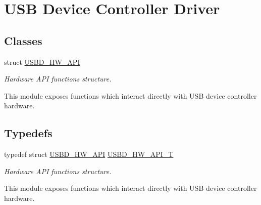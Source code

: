 \hypertarget{group__USBD__HW}{}\section{U\+SB Device Controller Driver}
\label{group__USBD__HW}
\subsection*{Classes}
\begin{DoxyCompactItemize}
\item 
struct \hyperlink{structUSBD__HW__API}{U\+S\+B\+D\+\_\+\+H\+W\+\_\+\+A\+PI}
\begin{DoxyCompactList}\small\item\em Hardware A\+PI functions structure.

This module exposes functions which interact directly with U\+SB device controller hardware. \end{DoxyCompactList}\end{DoxyCompactItemize}
\subsection*{Typedefs}
\begin{DoxyCompactItemize}
\item 
typedef struct \hyperlink{structUSBD__HW__API}{U\+S\+B\+D\+\_\+\+H\+W\+\_\+\+A\+PI} \hyperlink{group__USBD__HW_ga4df5b7beaddc4e9267c320d92b4434fc}{U\+S\+B\+D\+\_\+\+H\+W\+\_\+\+A\+P\+I\+\_\+T}
\begin{DoxyCompactList}\small\item\em Hardware A\+PI functions structure.

This module exposes functions which interact directly with U\+SB device controller hardware. \end{DoxyCompactList}\end{DoxyCompactItemize}
